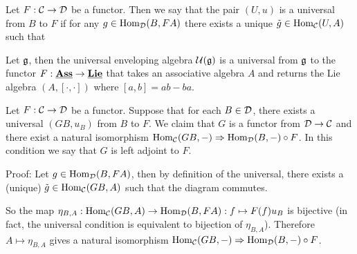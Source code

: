 \begin{itemize}
        \begin{definition}
            Let $F:\mathcal{C}\to \mathcal{D}$ be a functor. Then we say that the pair $(U,u)$ is a universal from $B$ to $F$ if 
            for any $g\in \text{Hom}_{\mathcal{D}}(B,FA)$ there exists a unique $\tilde{g}\in\text{Hom}_{\mathcal{C}}(U,A)$ such that 
            \begin{center}
            \end{center}
        \end{definition}
        \begin{example}
            Let $\mathfrak{g}$, then the universal enveloping algebra $\mathcal{U}(\mathfrak{g})$ is a universal from 
            $\mathfrak{g}$ to the functor $F:\underline{\textbf{Ass}}\to\underline{\textbf{Lie}}$ that takes an associative algebra $A$ and returns the Lie algebra
            $(A,[\cdot,\cdot])$ where $[a,b]=ab-ba$.
        \end{example}
    
    \begin{proposition}
        Let $F:\mathcal{C}\to \mathcal{D}$ be a functor. Suppose that for each $B\in\mathcal{D}$, there exists a universal 
        $(GB, u_B)$ from $B$ to $F$. We claim that $G$ is a functor from $\mathcal{D}\to\mathcal{C}$ and there exist a natural 
        isomorphism $\text{Hom}_{\mathcal{C}}(GB,-)\Rightarrow\text{Hom}_{\mathcal{D}}(B,-)\circ F$. In this condition we say that 
        $G$ is left adjoint to $F$.
    \end{proposition}
    Proof: Let $g\in\text{Hom}_{\mathcal{D}}(B,FA)$, then by definition of the universal, there exists 
    a (unique) $\tilde{g}\in\text{Hom}_{\mathcal{C}}(GB,A)$ such that the diagram commutes. 
    \begin{center}
    \end{center}
    So the map $\eta_{B,A}:\text{Hom}_{\mathcal{C}}(GB,A)\to\text{Hom}_{\mathcal{D}}(B,FA):f\mapsto F(f)u_B$ is bijective (in fact, 
    the universal condition is equivalent to bijection of $\eta_{B,A}$).
    Therefore $A\mapsto \eta_{B,A}$ gives a natural isomorphism $\text{Hom}_{\mathcal{C}}(GB,-)\Rightarrow\text{Hom}_{\mathcal{D}}(B,-)\circ F$.
    \par 
    

\end{itemize}
